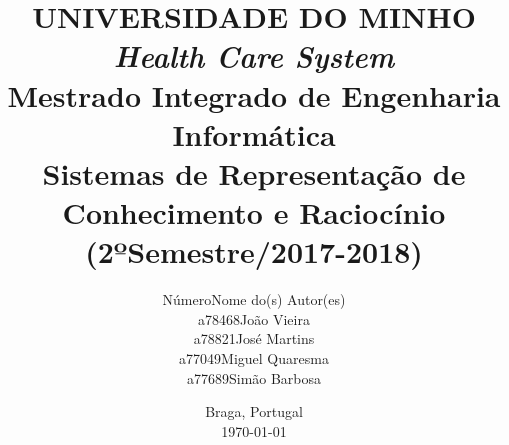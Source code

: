 \documentclass{article}
\begin{document}
\title{\Huge
       \textbf{UNIVERSIDADE DO MINHO}\\
       \vspace*{3cm}
       \huge
       \textbf{\textit{Health Care System}}\\
       \vspace*{3cm}
       \large
       Mestrado Integrado de Engenharia Informática\\
       \vspace*{2cm}
       Sistemas de Representação de Conhecimento e Raciocínio\\
       (2ºSemestre/2017-2018)
       \vspace*{\fill}}

\author{\hspace*{-5cm}Número\hspace*{1cm}Nome do(s) Autor(es)\hspace*{\fill}\\
        \hspace*{-5cm}a78468\hspace*{1cm}João Vieira\hspace*{\fill}\\
        \hspace*{-5cm}a78821\hspace*{1cm}José Martins\hspace*{\fill}\\
        \hspace*{-5cm}a77049\hspace*{1cm}Miguel Quaresma\hspace*{\fill}\\
        \hspace*{-5cm}a77689\hspace*{1cm}Simão Barbosa\hspace*{\fill}}

\date{\hspace*{\fill}Braga, Portugal\hspace*{1cm}\\
      \hspace*{\fill}\today\hspace*{1cm}}

\maketitle

\newpage

\justify

\vspace*{\fill}
\end{document}
